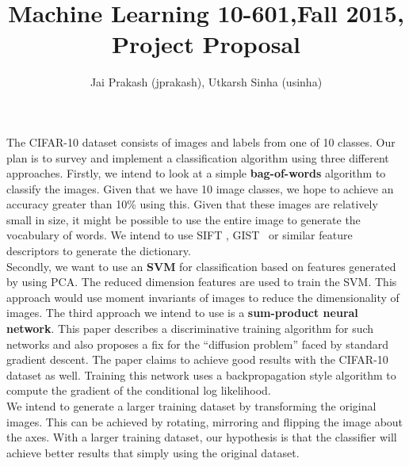 \documentclass{article}
\title{Machine Learning 10-601,Fall 2015, Project Proposal}
\author{Jai Prakash (jprakash), Utkarsh Sinha (usinha)}
\begin{document}


  \maketitle
  The CIFAR-10 dataset consists of images and labels from one of 10 classes. Our plan is to survey and implement a classification algorithm using three different approaches. Firstly, we intend to look at a simple \textbf{bag-of-words} algorithm to classify the images. Given that we have 10 image classes, we hope to achieve an accuracy greater than 10\% using this. Given that these images are relatively small in size, it might be possible to use the entire image to generate the vocabulary of words. We intend to use SIFT\cite{sift} , GIST\cite{gabor}  or similar feature descriptors to generate the dictionary.\\

  Secondly, we want to use an \textbf{SVM} for classification based on features generated by using PCA. The reduced dimension features are used to train the SVM. This approach would use moment invariants of images to reduce the dimensionality of images\cite{svm}. The third approach we intend to use is a \textbf{sum-product neural network}\cite{neural}. This paper describes a discriminative training algorithm for such networks and also proposes a fix for the “diffusion problem” faced by standard gradient descent. The paper claims to achieve good results with the CIFAR-10 dataset as well. Training this network uses a backpropagation style algorithm to compute the gradient of the conditional log likelihood.\\

  We intend to generate a larger training dataset by transforming the original images. This can be achieved by rotating, mirroring and flipping the image about the axes. With a larger training dataset, our hypothesis is that the classifier will achieve better results that simply using the original dataset.\\
\end{document}
